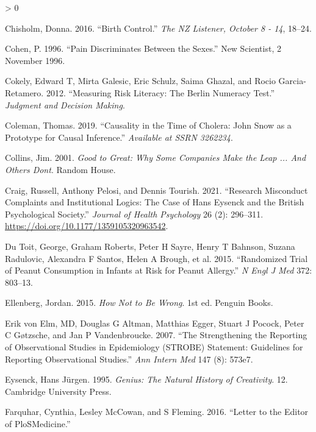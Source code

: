 \documentclass[
  10pt,
  b5paper]{book}
\newlength{\cslhangindent}
\newenvironment{CSLReferences}[2] %
 {%
  \setlength{\parindent}{0pt}
  \ifodd #1 \everypar{\setlength{\hangindent}{\cslhangindent}}\ignorespaces\fi
  \ifnum #2 > 0
  \setlength{\parskip}{#2\baselineskip}
  \fi
 }%
 {}
\begin{document}
\begin{CSLReferences}{1}{0}
\leavevmode\hypertarget{ref-chisholm_2016}{}%
Chisholm, Donna. 2016. {``Birth Control.''} \emph{The NZ Listener, October 8 - 14}, 18--24.

\leavevmode\hypertarget{ref-cohen1996}{}%
Cohen, P. 1996. {``Pain Discriminates Between the Sexes.''} New Scientist, 2 November 1996.

\leavevmode\hypertarget{ref-cokely2012measuring}{}%
Cokely, Edward T, Mirta Galesic, Eric Schulz, Saima Ghazal, and Rocio Garcia-Retamero. 2012. {``Measuring Risk Literacy: The Berlin Numeracy Test.''} \emph{Judgment and Decision Making}.

\leavevmode\hypertarget{ref-coleman2019causality}{}%
Coleman, Thomas. 2019. {``Causality in the Time of Cholera: John {S}now as a Prototype for Causal Inference.''} \emph{Available at SSRN 3262234}.

\leavevmode\hypertarget{ref-collins_2001}{}%
Collins, Jim. 2001. \emph{Good to Great: Why Some Companies Make the Leap ... And Others Dont}. Random House.

\leavevmode\hypertarget{ref-CraigEtAl}{}%
Craig, Russell, Anthony Pelosi, and Dennis Tourish. 2021. {``Research Misconduct Complaints and Institutional Logics: The Case of Hans Eysenck and the British Psychological Society.''} \emph{Journal of Health Psychology} 26 (2): 296--311. \url{https://doi.org/10.1177/1359105320963542}.

\leavevmode\hypertarget{ref-du2015randomized}{}%
Du Toit, George, Graham Roberts, Peter H Sayre, Henry T Bahnson, Suzana Radulovic, Alexandra F Santos, Helen A Brough, et al. 2015. {``Randomized Trial of Peanut Consumption in Infants at Risk for Peanut Allergy.''} \emph{N Engl J Med} 372: 803--13.

\leavevmode\hypertarget{ref-ellenberg_2015}{}%
Ellenberg, Jordan. 2015. \emph{How Not to Be Wrong}. 1st ed. Penguin Books.

\leavevmode\hypertarget{ref-erik2007strengthening}{}%
Erik von Elm, MD, Douglas G Altman, Matthias Egger, Stuart J Pocock, Peter C Gøtzsche, and Jan P Vandenbroucke. 2007. {``The Strengthening the Reporting of Observational Studies in Epidemiology (STROBE) Statement: Guidelines for Reporting Observational Studies.''} \emph{Ann Intern Med} 147 (8): 573e7.

\leavevmode\hypertarget{ref-eysenck1995genius}{}%
Eysenck, Hans Jürgen. 1995. \emph{Genius: The Natural History of Creativity}. 12. Cambridge University Press.

\leavevmode\hypertarget{ref-farquhar2016letter}{}%
Farquhar, Cynthia, Lesley McCowan, and S Fleming. 2016. {``Letter to the Editor of PloSMedicine.''}


\end{CSLReferences}
\end{document}
